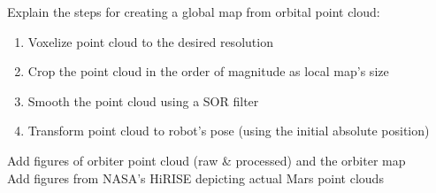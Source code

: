 \bigskip
\noindent
Explain the steps for creating a global map from orbital point cloud:
\begin{enumerate}
    \item  Voxelize point cloud to the desired resolution
    \item Crop the point cloud in the order of magnitude as local map's size
    \item Smooth the point cloud using a SOR filter
    \item Transform point cloud to robot's pose (using the initial absolute position)
\end{enumerate}

\noindent
Add figures of orbiter point cloud (raw \& processed) and the orbiter map\\
Add figures from NASA's HiRISE depicting actual Mars point clouds

